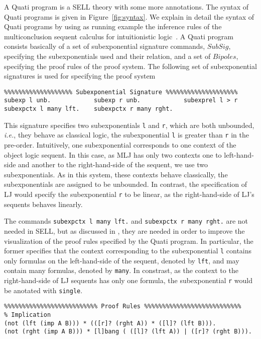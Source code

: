 \documentclass{llncs}
\newcommand{\ie}{{\em i.e.}}
\begin{document}
A Quati program is a SELL theory with some more annotations. The syntax of Quati programs is given in Figure~\ref{fig:syntax}. 
We explain in detail the syntax of Quati programs 
by using as running example the inference rules of the multiconclusion sequent calculus for intuitionistic logic~\cite{maehara}.
A Quati program consists basically of a set of subexponential signature commands, $SubSig$, specifying the subexponentials 
used and their relation, and a set of $Bipoles$, specifying the proof rules of the proof system. The following set of subexponential 
signatures is used for specifying the proof system 

\begin{verbatim}
%%%%%%%%%%%%%%%%%%% Subexponential Signature %%%%%%%%%%%%%%%%%%%%
subexp l unb.            subexp r unb.            subexprel l > r
subexpctx l many lft.    subexpctx r many rght.
\end{verbatim}

This signature specifies two subexponentials \texttt{l} and \texttt{r}, which are both unbounded, \ie, they 
behave as classical logic, the subexponential \texttt{l} is greater than \texttt{r} in the pre-order. Intuitively, 
one subexponential corresponds to one context of the object logic sequent. In this case, as MLJ has only two
contexts one to left-hand-side and another to the right-hand-side of the sequent, we use two subexponentials. 
As in this system, these contexts behave classically, the subexponentials are assigned to be unbounded. In contrast, 
the specification of LJ would specify the subexponential \texttt{r} to be linear, as the right-hand-side of LJ's 
sequents behaves linearly.

The commands \texttt{subexpctx l many lft.} and  \texttt{subexpctx r many rght.} are not needed in SELL, but as discussed 
in \cite{nigam14ebl}, they are needed in order to improve the visualization of the proof rules specified by the Quati 
program. In particular, the former specifies that the context corresponding to the subexponential \texttt{l} contains 
only formulas on the left-hand-side of the sequent, denoted by \texttt{lft}, and may contain many formulas, denoted 
by \texttt{many}. In constrast, as the context to the right-hand-side of LJ sequents has only one formula, the 
subexponential \texttt{r} would be anotated with \texttt{single}.
\begin{verbatim}
%%%%%%%%%%%%%%%%%%%%%%%%%% Proof Rules %%%%%%%%%%%%%%%%%%%%%%%%%%%
% Implication
(not (lft (imp A B))) * (([r]? (rght A)) * ([l]? (lft B))).
(not (rght (imp A B))) * [l]bang ( ([l]? (lft A)) | ([r]? (rght B))).
\end{verbatim}
\end{document}
